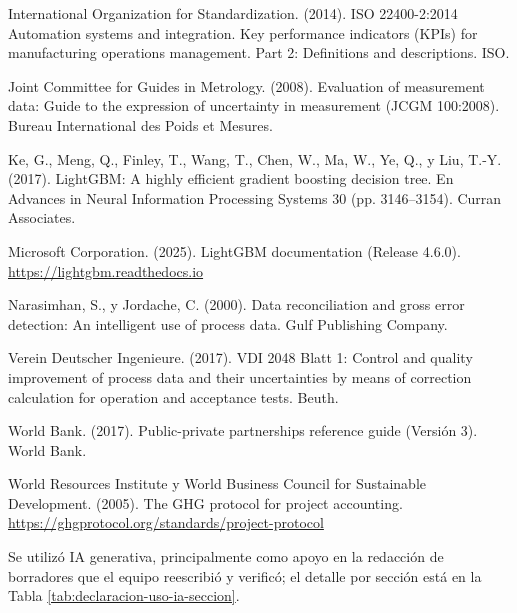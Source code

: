 \documentclass[subdoc]{../../comun/overfore}
\begin{document}
\begin{referencias}
\item International Organization for Standardization. (2014). ISO 22400-2:2014 Automation systems and integration. Key performance indicators (KPIs) for manufacturing operations management. Part 2: Definitions and descriptions. ISO.
\item Joint Committee for Guides in Metrology. (2008). Evaluation of measurement data: Guide to the expression of uncertainty in measurement (JCGM 100:2008). Bureau International des Poids et Mesures.
\item Ke, G., Meng, Q., Finley, T., Wang, T., Chen, W., Ma, W., Ye, Q., y Liu, T.-Y. (2017). LightGBM: A highly efficient gradient boosting decision tree. En Advances in Neural Information Processing Systems 30 (pp. 3146–3154). Curran Associates.
\item Microsoft Corporation. (2025). LightGBM documentation (Release 4.6.0). \href{https://lightgbm.readthedocs.io}{https://lightgbm.readthedocs.io}
\item Narasimhan, S., y Jordache, C. (2000). Data reconciliation and gross error detection: An intelligent use of process data. Gulf Publishing Company.
\item Verein Deutscher Ingenieure. (2017). VDI 2048 Blatt 1: Control and quality improvement of process data and their uncertainties by means of correction calculation for operation and acceptance tests. Beuth.
\item World Bank. (2017). Public-private partnerships reference guide (Versión 3). World Bank.
\item World Resources Institute y World Business Council for Sustainable Development. (2005). The GHG protocol for project accounting. \href{https://ghgprotocol.org/standards/project-protocol}{https://ghgprotocol.org/standards/project-protocol}
\end{referencias}

Se utilizó IA generativa, principalmente como apoyo en la redacción de borradores que el equipo reescribió y verificó; el detalle por sección está en la Tabla \ref{tab:declaracion-uso-ia-seccion}.
\end{document}
